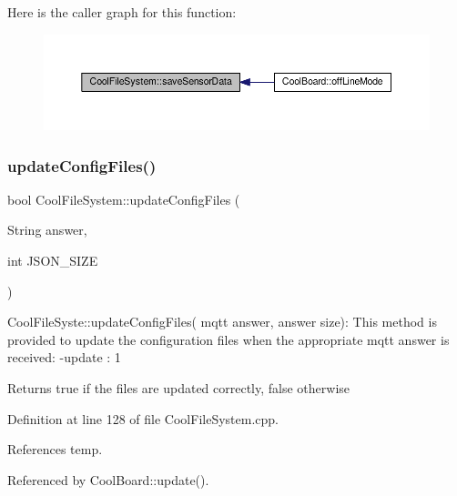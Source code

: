 Here is the caller graph for this function\+:\nopagebreak
\begin{figure}[H]
\begin{center}
\leavevmode
\includegraphics[width=350pt]{classCoolFileSystem_a4c560c2ddd40b74b7758e6ceb2c58957_icgraph}
\end{center}
\end{figure}
\mbox{\label{classCoolFileSystem_a32dad79ae80182a83e2e8f52286b7c7b}} 
\subsubsection{\texorpdfstring{update\+Config\+Files()}{updateConfigFiles()}}
{\footnotesize\ttfamily bool Cool\+File\+System\+::update\+Config\+Files (\begin{DoxyParamCaption}\item[{String}]{answer,  }\item[{int}]{J\+S\+O\+N\+\_\+\+S\+I\+ZE }\end{DoxyParamCaption})}

Cool\+File\+Syste\+::update\+Config\+Files( mqtt answer, answer size)\+: This method is provided to update the configuration files when the appropriate mqtt answer is received\+: -\/update \+: 1

\begin{DoxyReturn}{Returns}
true if the files are updated correctly, false otherwise 
\end{DoxyReturn}


Definition at line 128 of file Cool\+File\+System.\+cpp.



References temp.



Referenced by Cool\+Board\+::update().


